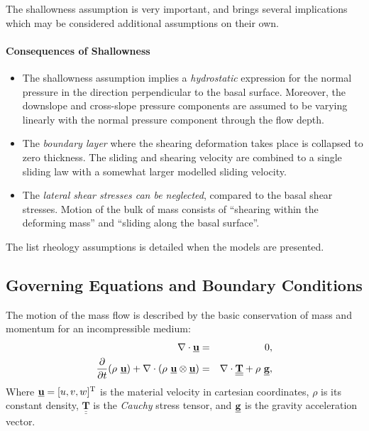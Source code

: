 \documentclass{article}
\def\dt{\partial t}
\begin{document}
The shallowness assumption is very important, and brings several implications which may be considered additional assumptions on their own.

\paragraph{Consequences of Shallowness}
\begin{itemize}
\item The shallowness assumption implies a \textit{hydrostatic} expression for the normal pressure in the direction perpendicular to the basal surface. Moreover, the downslope and cross-slope pressure components are assumed to be varying linearly with the normal pressure component through the flow depth.

\item The \textit{boundary layer} where the shearing deformation takes place is collapsed to zero thickness. The sliding and shearing velocity are combined to a single sliding law with a somewhat larger modelled sliding velocity.

\item The \textit{lateral shear stresses can be neglected}, compared to the basal shear stresses. Motion of the bulk of mass consists of ``shearing within the deforming mass'' and ``sliding along the basal surface''.
\end{itemize}

The list rheology assumptions is detailed when the models are presented.



\subsection{Governing Equations and Boundary Conditions}\label{subsec:GovEqsBCs}
The motion of the mass flow is described by the basic conservation of mass and momentum for an incompressible medium:
\begin{eqnarray}\label{eq:N_S}
\nabla \cdot\underline{{\textbf u}} &=& 0, \nonumber \\
\dfrac{\partial}{\dt}(\rho \ \underline{{\textbf u}})+\nabla \cdot (\rho \ \underline{{\textbf u}}\otimes \underline{{\textbf u}}) &=& \nabla \cdot \underline{\underline{{\mathbf{T}}}}+\rho \ \underline{{\textbf g}},
\end{eqnarray}
Where $\underline{{\textbf u}}=[u, v, w]^{\mathrm{T}}$ is the material velocity in cartesian coordinates, $\rho$ is its constant density, $\underline{\underline{{\mathbf{T}}}}$ is the \textit{Cauchy} stress tensor, and $\underline{{\textbf g}}$ is the gravity acceleration vector.
\end{document}
